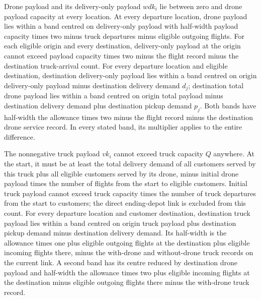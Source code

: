 \documentclass[10pt]{article}
\begin{document}
Drone payload and its delivery-only payload $wdk_i$ lie between zero and drone payload capacity at every location. At every departure location, drone payload lies within a band centred on delivery-only payload with half-width payload capacity times two minus truck departures minus eligible outgoing flights. For each eligible origin and every destination, delivery-only payload at the origin cannot exceed payload capacity times two minus the flight record minus the destination truck-arrival count. For every departure location and eligible destination, destination delivery-only payload lies within a band centred on origin delivery-only payload minus destination delivery demand $d_j$; destination total drone payload lies within a band centred on origin total payload minus destination delivery demand plus destination pickup demand $p_j$. Both bands have half-width the allowance times two minus the flight record minus the destination drone service record. In every stated band, its multiplier applies to the entire difference.

The nonnegative truck payload $vk_i$ cannot exceed truck capacity $Q$ anywhere. At the start, it must be at least the total delivery demand of all customers served by this truck plus all eligible customers served by its drone, minus initial drone payload times the number of flights from the start to eligible customers. Initial truck payload cannot exceed truck capacity times the number of truck departures from the start to customers; the direct ending-depot link is excluded from this count. For every departure location and customer destination, destination truck payload lies within a band centred on origin truck payload plus destination pickup demand minus destination delivery demand. Its half-width is the allowance times one plus eligible outgoing flights at the destination plus eligible incoming flights there, minus the with-drone and without-drone truck records on the current link. A second band has its centre reduced by destination drone payload and half-width the allowance times two plus eligible incoming flights at the destination minus eligible outgoing flights there minus the with-drone truck record.
\end{document}
